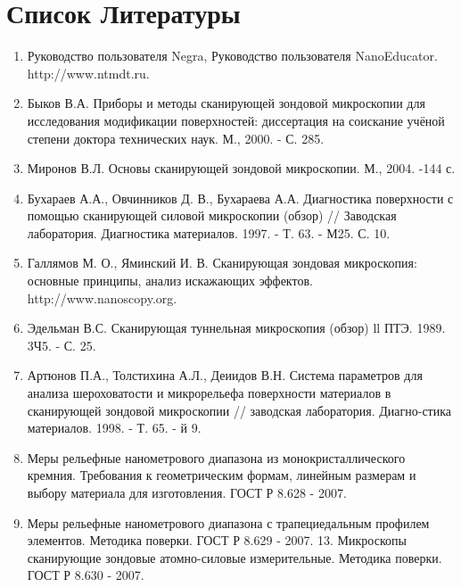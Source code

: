 \documentclass[a4paper]{article}
\begin{document}
\section{Список Литературы}
\begin{enumerate}
\item Руководство пользователя Negra, Руководство пользователя NanoEducator. http://www.ntmdt.ru.
\item Быков В.А. Приборы и методы сканирующей зондовой микроскопии для исследования модификации поверхностей: диссертация на соискание учёной степени доктора технических наук. М., 2000. - С. 285.
\item Миронов В.Л. Основы сканирующей зондовой микроскопии. М., 2004. -144 с.
\item Бухараев А.А., Овчинников Д. В., Бухараева А.А. Диагностика поверхности с помощью сканирующей силовой микроскопии (обзор) // Заводская лаборатория. Диагностика материалов. 1997. - Т. 63. - М25. С. 10.
\item Галлямов М. О., Яминский И. В. Сканирующая зондовая микроскопия: основные принципы, анализ искажающих эффектов. http://www.nanoscopy.org.
\item Эдельман В.С. Сканирующая туннельная микроскопия (обзор) ll ПТЭ. 1989. 3Ч5. - С. 25.
\item Артюнов П.А., Толстихина А.Л., Деиидов В.Н. Система параметров для анализа шероховатости и микрорельефа поверхности материалов в сканирующей зондовой микроскопии // заводская лаборатория. Диагно-стика материалов. 1998. - Т. 65. - й 9.
\item Меры рельефные нанометрового диапазона из монокристаллического кремния. Требования к геометрическим формам, линейным размерам и выбору материала для изготовления. ГОСТ Р 8.628 - 2007.
\item Меры рельефные нанометрового диапазона с трапециедальным профилем элементов. Методика поверки. ГОСТ Р 8.629 - 2007. 13. Микроскопы сканирующие зондовые атомно-силовые измерительные. Методика поверки. ГОСТ Р 8.630 - 2007.
\end{enumerate}
\end{document}
